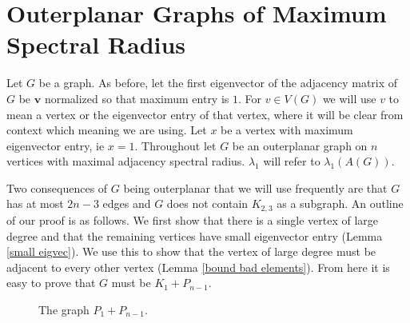 \section{Outerplanar Graphs of Maximum Spectral Radius}\label{outerplanar}
Let $G$ be a graph. As before, let the first eigenvector of the adjacency matrix of $G$ be $\textbf{v}$ normalized so that maximum entry is $1$. For $v\in V(G)$ we will use $v$ to mean a vertex or the eigenvector entry of that vertex, where it will be clear from context which meaning we are using. Let $x$ be a vertex with maximum eigenvector entry, ie $x=1$.  Throughout let $G$ be an outerplanar graph on $n$ vertices with maximal adjacency spectral radius.  $\lambda_1$ will refer to $\lambda_1(A(G))$. 

Two consequences of $G$ being outerplanar that we will use frequently are that $G$ has at most $2n-3$ edges and $G$ does not contain $K_{2,3}$ as a subgraph. An outline of our proof is as follows. We first show that there is a single vertex of large degree and that the remaining vertices have small eigenvector entry (Lemma \ref{small eigvec}). We use this to show that the vertex of large degree must be adjacent to every other vertex (Lemma \ref{bound bad elements}). From here it is easy to prove that $G$ must be $K_1+P_{n-1}$.

\begin{figure}[]
\begin{center}
\begingroup

\setlength{\unitlength}{.01cm}
{
\setlength{\fboxsep}{10pt}
}
\endgroup
\end{center}
\caption{The graph $P_1 + P_{n-1}$.
   \label{fig:outerplanar}}
\end{figure}

